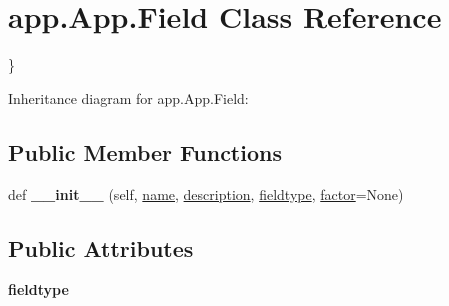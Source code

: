 \hypertarget{classapp_1_1_app_1_1_field}{}\section{app.\+App.\+Field Class Reference}
\label{classapp_1_1_app_1_1_field}


\}  




Inheritance diagram for app.\+App.\+Field\+:
\subsection*{Public Member Functions}
\begin{DoxyCompactItemize}
\item 
def {\bfseries \+\_\+\+\_\+init\+\_\+\+\_\+} (self, \hyperlink{group___g_u_i_ga74bf1ee16d2de49ee707cab9ecba123b}{name}, \hyperlink{group___g_u_i_gadd42fca0c131874daa29902266d514cd}{description}, \hyperlink{group___g_u_i_ga2b84546c227ee521e1a4776cd07aabe8}{fieldtype}, \hyperlink{group___g_u_i_ga6a50e1c443b963d286ed393be38e00fd}{factor}=None)
\end{DoxyCompactItemize}
\subsection*{Public Attributes}
\begin{DoxyCompactItemize}
\item 
{\bfseries fieldtype}
\end{DoxyCompactItemize}
